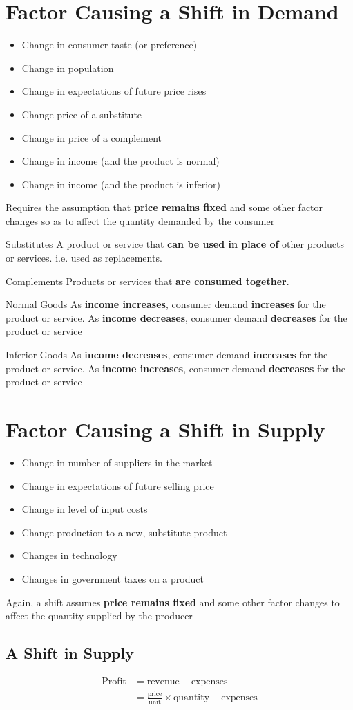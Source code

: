 \section{Factor Causing a Shift in Demand}
\begin{itemize}
	\item Change in consumer taste (or preference)
	\item Change in population
	\item Change in expectations of future price rises
	\item Change price of a substitute
	\item Change in price of a complement
	\item Change in income (and the product is normal)
	\item Change in income (and the product is inferior)
\end{itemize}
Requires the assumption that \textbf{price remains fixed} and some other factor changes so as to affect the quantity demanded by the consumer
\begin{note}{Substitutes}
	A product or service that \textbf{can be used in place of} other products or services. i.e. used as replacements.
\end{note}
\begin{note}{Complements}
	Products or services that \textbf{are consumed together}.
\end{note}
\begin{note}{Normal Goods}
	As \textbf{income increases}, consumer demand \textbf{increases} for the product or service. As \textbf{income decreases}, consumer demand \textbf{decreases} for the product or service
\end{note}
\begin{note}{Inferior Goods}
	As \textbf{income decreases}, consumer demand \textbf{increases} for the product or service. As \textbf{income increases}, consumer demand \textbf{decreases} for the product or service
\end{note}

\section{Factor Causing a Shift in Supply}
\begin{itemize}
	\item Change in number of suppliers in the market
	\item Change in expectations of future selling price
	\item Change in level of input costs
	\item Change production to a new, substitute product
	\item Changes in technology
	\item Changes in government taxes on a product
\end{itemize}
Again, a shift assumes \textbf{price remains fixed} and some other factor changes to affect the quantity supplied by the producer
\subsection{A Shift in Supply}
\begin{align*}
\text{Profit} &= \text{revenue} - \text{expenses}\\
&= \frac{\text{price}}{\text{unit}}\times\text{quantity}-\text{expenses}
\end{align*}